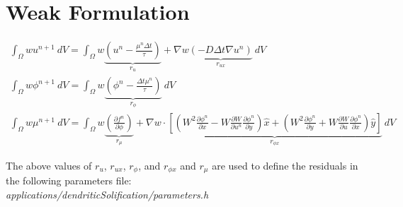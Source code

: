 \documentclass[10pt]{article}
\begin{document}
\section{Weak Formulation}

\begin{gather}
\int_{\Omega}   w  u^{n+1}  ~dV = \int_{\Omega}   w \underbrace{\left(u^{n} - \frac{\mu^n \Delta t}{\tau}\right)}_{r_u} + \nabla w \underbrace{(-D \Delta t \nabla u^n)}_{r_{ux}} ~dV \\
\int_{\Omega}   w  \phi^{n+1}  ~dV = \int_{\Omega}   w \underbrace{\left(\phi^n - \frac{\Delta t \mu^n}{\tau}\right)}_{r_{\phi}} ~dV \\
\int_{\Omega}   w  \mu^{n+1}  ~dV = \int_{\Omega}   w \underbrace{\left(\frac{\partial f^n}{\partial \phi}\right)}_{r_{\mu}} + \nabla w \cdot \underbrace{\left[\left(W^2 \frac{\partial \phi^n}{\partial x} - W \frac{\partial W}{\partial u^n} \frac{\partial \phi^n}{\partial y}\right)\hat{x}  + \left(W^2 \frac{\partial \phi^n}{\partial y} + W \frac{\partial W}{\partial u} \frac{\partial \phi^n}{\partial x}\right) \hat{y} \right]}_{r_{\phi x}}  ~dV 
\end{gather}






\vskip 0.25in
The above values of $r_{u}$, $r_{ux}$, $r_{\phi}$, and $r_{\phi x}$ and $r_{\mu}$ are used to define the residuals in the following parameters file: \\
\textit{applications/dendriticSolification/parameters.h}
\end{document}
